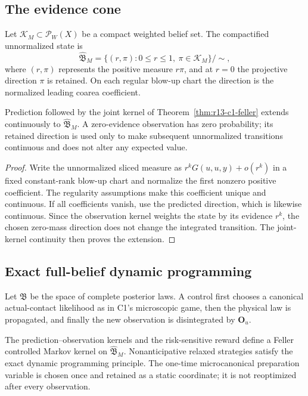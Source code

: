 \subsection{The evidence cone}

Let $\mathcal K_M\subset\mathcal P_W(X)$ be a compact weighted belief set.
The compactified unnormalized state is
\[
 \widehat{\mathfrak B}_M
 =\{(r,\pi):0\le r\le1,\ \pi\in\mathcal K_M\}/\sim,
\]
where $(r,\pi)$ represents the positive measure $r\pi$, and at $r=0$ the
projective direction $\pi$ is retained.  On each regular blow-up chart the
direction is the normalized leading coarea coefficient.

\begin{proposition}
\label{prop:r13-c1-zero}
Prediction followed by the joint kernel of
Theorem~\ref{thm:r13-c1-feller} extends continuously to
$\widehat{\mathfrak B}_M$.  A zero-evidence observation has zero probability;
its retained direction is used only to make subsequent unnormalized
transitions continuous and does not alter any expected value.
\end{proposition}

\begin{proof}
Write the unnormalized sliced measure as
$r^kG(
u,u,y)+o(r^k)$ in a fixed constant-rank blow-up chart and normalize the
first nonzero positive coefficient.  The regularity assumptions make this
coefficient unique and continuous.  If all coefficients vanish, use the
predicted direction, which is likewise continuous.  Since the observation
kernel weights the state by its evidence $r^k$, the chosen zero-mass direction
does not change the integrated transition.  The joint-kernel continuity then
proves the extension.
\end{proof}

\subsection{Exact full-belief dynamic programming}

Let $\mathfrak B$ be the space of complete posterior laws.  A control first
chooses a canonical actual-contact likelihood as in C1's microscopic game,
then the physical law is propagated, and finally the new observation is
disintegrated by $\mathbf O_u$.

\begin{theorem}
\label{thm:r13-c1-dpp}
The prediction--observation kernels and the risk-sensitive reward define a
Feller controlled Markov kernel on $\widehat{\mathfrak B}_M$.  Nonanticipative
relaxed strategies satisfy the exact dynamic programming principle.  The
one-time microcanonical preparation variable is chosen once and retained as a
static coordinate; it is not reoptimized after every observation.
\end{theorem}

